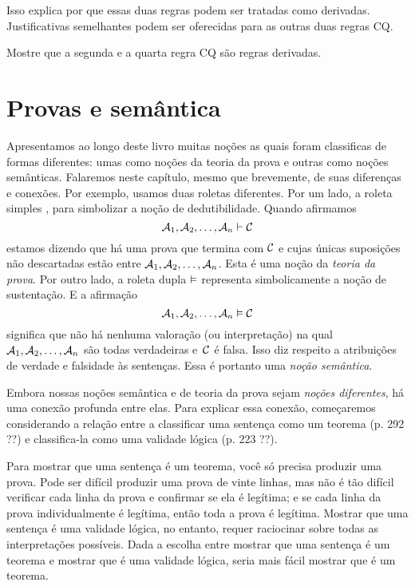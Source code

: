  Isso explica por que essas duas regras podem ser tratadas como derivadas.  Justificativas semelhantes podem ser oferecidas para as outras duas regras CQ.

\practiceproblems

\problempart
Mostre que a segunda e a quarta regra  CQ são regras derivadas.


\chapter{Provas e semântica}

 Apresentamos ao longo deste livro muitas noções as quais foram classificas de formas diferentes: umas como noções da teoria da prova e outras como  noções semânticas.  Falaremos neste capítulo, mesmo que brevemente, de suas diferenças  e conexões. 
Por exemplo, usamos duas roletas diferentes.  Por um lado, a roleta simples  \proves,  para simbolizar a noção de dedutibilidade. Quando afirmamos 
$$\mathcal{A}_1, \mathcal{A}_2, \ldots, \mathcal{A}_n \vdash \mathcal{C}$$
estamos dizendo que há uma prova que termina com $\mathcal{C}$ e cujas únicas suposições não descartadas estão entre  $\mathcal{A}_1, \mathcal{A}_2, \ldots, \mathcal{A}_n$. Esta é uma noção da \emph{teoria da prova}.   Por outro lado,  a roleta  dupla  $\vDash$  representa simbolicamente a noção de sustentação. E a afirmação 
$$\mathcal{A}_1, \mathcal{A}_2, \ldots, \mathcal{A}_n \vDash \mathcal{C}$$
significa que não há nenhuma valoração (ou interpretação) na qual  $\mathcal{A}_1, \mathcal{A}_2, \ldots, \mathcal{A}_n$ são todas verdadeiras e~$\mathcal{C}$ é falsa. Isso diz respeito a atribuições de verdade e falsidade às sentenças. Essa é portanto uma \emph{noção semântica}.

Embora nossas noções semântica e de teoria da prova sejam \emph{noções diferentes}, há uma conexão profunda entre elas. Para explicar essa conexão, começaremos considerando a relação entre a classificar uma sentença como um teorema (p. 292  ??) e classifica-la como uma validade lógica (p. 223 ??).

Para mostrar que uma sentença é um teorema, você só precisa produzir uma prova. Pode ser difícil produzir uma prova de vinte linhas, mas não é tão difícil verificar cada linha da prova e confirmar se ela é legítima; e se cada linha da prova individualmente é legítima, então toda a prova é legítima. Mostrar que uma sentença é uma validade lógica, no entanto, requer raciocinar sobre todas as interpretações possíveis. Dada a escolha entre mostrar que uma sentença é um teorema e mostrar que é uma validade lógica, seria mais fácil mostrar que é um teorema.

